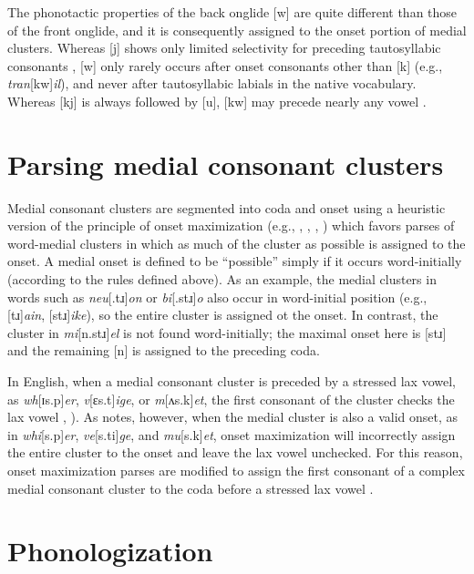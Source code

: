 The phonotactic properties of the back onglide [w] are quite different than those of the front onglide, and it is consequently assigned to the onset portion of medial clusters. Whereas [j] shows only limited selectivity for preceding tautosyllabic consonants \citep{Kaye1996}, [w] only rarely occurs after onset consonants other than [k] (e.g., \emph{tran}[kw]\emph{il}), and never after tautosyllabic labials in the native vocabulary. Whereas [kj] is always followed by [u], [kw] may precede nearly any vowel \citep[161]{Davis1995}.

\section{Parsing medial consonant clusters}

Medial consonant clusters are segmented into coda and onset using a heuristic version of the principle of onset maximization (e.g., \citealp[42f.]{Kahn1976}, \citealp{Kurylowicz1948}, \citealp[75]{Pulgram1970}, \citealp[][358f.]{Selkirk1982b}) which favors parses of word-medial clusters in which as much of the cluster as possible is assigned to the onset. A medial onset is defined to be ``possible'' simply if it occurs word-initially (according to the rules defined above). As an example, the medial clusters in words such as \emph{neu}[.tɹ]\emph{on} or \emph{bi}[.stɹ]\emph{o} also occur in word-initial position (e.g., [tɹ]\emph{ain}, [stɹ]\emph{ike}), so the entire cluster is assigned ot the onset. In contrast, the cluster in \emph{mi}[n.stɹ]\emph{el} is not found word-initially; the maximal onset here is [stɹ] and the remaining [n] is assigned to the preceding coda.

In English, when a medial consonant cluster is preceded by a stressed lax vowel, as \emph{wh}[ɪs.p]\emph{er}, \emph{v}[ɛs.t]\emph{ige}, or \emph{m}[ʌs.k]\emph{et}, the first consonant of the cluster checks the lax vowel \citep[3]{Hammond1997}, \citet{Treiman1990}). As \citet[55]{Harris1994} notes, however, when the medial cluster is also a valid onset, as in \emph{whi}[s.p]\emph{er}, \emph{ve}[s.ti]\emph{ge}, and \emph{mu}[s.k]\emph{et}, onset maximization will incorrectly assign the entire cluster to the onset and leave the lax vowel unchecked. For this reason, onset maximization parses are modified to assign the first consonant of a complex medial consonant cluster to the coda before a stressed lax vowel \citep[48]{Pulgram1970}.

\section{Phonologization}

